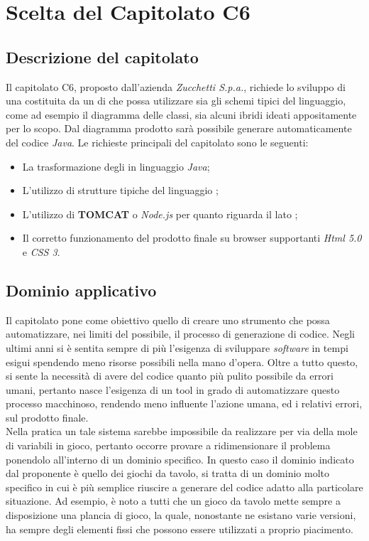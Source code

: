 \section{Scelta del Capitolato C6}
  \subsection{Descrizione del capitolato}
    Il capitolato C6, proposto dall'azienda \emph{Zucchetti S.p.a.}, richiede lo sviluppo di una  costituita da un  di  che possa utilizzare sia gli schemi tipici
    del linguaggio, come ad esempio il diagramma delle classi, sia alcuni ibridi ideati appositamente per lo scopo.
    Dal diagramma prodotto sarà possibile generare automaticamente del codice \emph{Java}.
    Le richieste principali del capitolato sono le seguenti:
    \begin{itemize}
      \item La trasformazione degli  in linguaggio \emph{Java};
      \item L'utilizzo di strutture tipiche del linguaggio ;
      \item L'utilizzo di \textbf{TOMCAT} o \emph{Node.js} per quanto riguarda il lato ;
      \item Il corretto funzionamento del prodotto finale su browser supportanti \emph{Html 5.0} e \emph{CSS 3}.
     \end{itemize}
   \subsection{Dominio applicativo}
    Il capitolato pone come obiettivo quello di creare uno strumento che possa automatizzare, nei limiti del possibile, il processo di generazione di codice.
    Negli ultimi anni si è sentita sempre di più l'esigenza di sviluppare \emph{software} in tempi esigui spendendo meno risorse possibili nella mano d'opera.
    Oltre a tutto questo, si sente la necessità di avere del codice quanto più pulito possibile da errori umani, pertanto nasce l'esigenza di un tool in grado di
    automatizzare questo processo macchinoso, rendendo meno influente l'azione umana, ed i relativi errori, sul prodotto finale. \\
    Nella pratica un tale sistema sarebbe impossibile da realizzare per via della mole di variabili in gioco, pertanto occorre provare a ridimensionare il problema ponendolo
    all'interno di un dominio specifico.
    In questo caso il dominio indicato dal proponente è quello dei giochi da tavolo, si tratta di un dominio molto specifico in cui è più semplice riuscire a generare del codice adatto alla particolare situazione.
    Ad esempio, è noto a tutti che un gioco da tavolo mette sempre a disposizione una plancia di gioco, la quale, nonostante ne esistano varie versioni, ha sempre degli
    elementi fissi che possono essere utilizzati a proprio piacimento.
